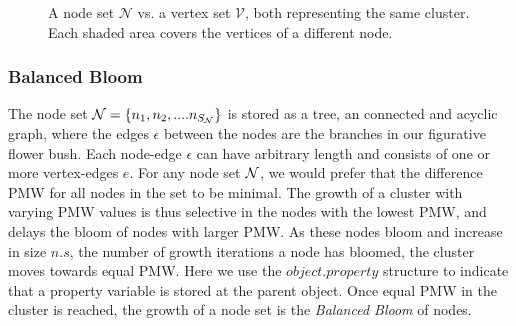 \begin{figure}
 \centering
  \caption{A node set $\mathcal{N}$ vs. a vertex set $\mathcal{V}$, both representing the same cluster. Each shaded area covers the vertices of a different  node.}\label{fig:nodesetpmw}
\end{figure}

\subsubsection{Balanced Bloom}

The node set $\mathcal{N} = \{n_1, n_2, .... n_{S_{\mathcal{N}}}\}$ is stored as a tree, an connected and acyclic graph, where the edges $\epsilon$ between the nodes are the branches in our figurative flower bush. Each node-edge $\epsilon$ can have arbitrary length and consists of one or more vertex-edges $e$. For any node set $\mathcal{N}$, we would prefer that the difference PMW for all nodes in the set to be minimal. The growth of a cluster with varying PMW values is thus selective in the nodes with the lowest PMW, and delays the bloom of nodes with larger PMW. As these nodes bloom and increase in size $n.s$, the number of growth iterations a node has bloomed, the cluster moves towards equal PMW. Here we use the $object.property$ structure to indicate that a property variable is stored at the parent object. Once equal PMW in the cluster is reached, the growth of a node set is the \emph{Balanced Bloom} of nodes.

